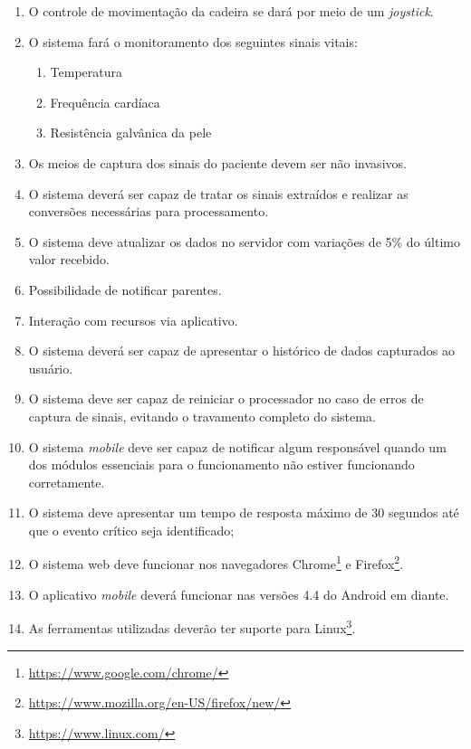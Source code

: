 \begin{enumerate}[resume*]
  \item O controle de movimentação da cadeira se dará por meio de um \textit{joystick}.
  \item O sistema fará o monitoramento dos seguintes sinais vitais:
    \begin{enumerate}[resume*]
      \item Temperatura
      \item Frequência cardíaca
      \item Resistência galvânica da pele
    \end{enumerate}
  \item Os meios de captura dos sinais do paciente devem ser não invasivos.
  \item O sistema deverá ser capaz de tratar os sinais extraídos e realizar as
    conversões necessárias para processamento.
  \item O sistema deve atualizar os dados no servidor com variações de 5\% do
    último valor recebido.
  \item Possibilidade de notificar parentes.
  \item Interação com recursos via aplicativo.
  \item O sistema deverá ser capaz de apresentar o histórico de dados
    capturados ao usuário.
  \item O sistema deve ser capaz de reiniciar o processador no caso de erros de
    captura de sinais, evitando o travamento completo do sistema.
  \item O sistema \textit{mobile} deve ser capaz de notificar algum responsável quando
    um dos módulos essenciais para o funcionamento não estiver funcionando corretamente.
  \item O sistema deve apresentar um tempo de resposta máximo de 30 segundos
    até que o evento crítico seja identificado;
  \item O sistema web deve funcionar nos navegadores
      Chrome\footnote{\url{https://www.google.com/chrome/}} e
        Firefox\footnote{\url{https://www.mozilla.org/en-US/firefox/new/}}.
    \item O aplicativo \textit{mobile} deverá funcionar nas versões 4.4 do Android em diante.
  \item As ferramentas utilizadas deverão ter suporte para
      Linux\footnote{\url{https://www.linux.com/}}.
\end{enumerate}

